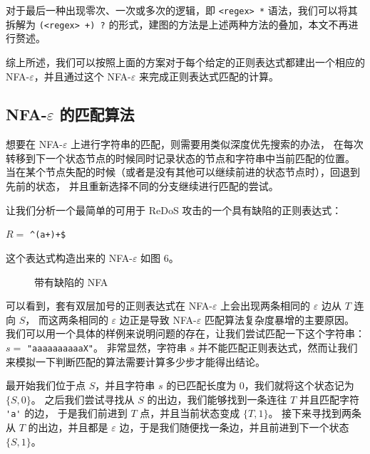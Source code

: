 \documentclass[hyperref,UTF8,12pt,a4paper]{ctexart}
\begin{document}
对于最后一种出现零次、一次或多次的逻辑，即 \verb|<regex> *| 语法，我们可以将其拆解为 \verb|(<regex> +) ?| 的形式，建图的方法是上述两种方法的叠加，本文不再进行赘述。

综上所述，我们可以按照上面的方案对于每个给定的正则表达式都建出一个相应的 NFA-$\varepsilon$，并且通过这个 NFA-$\varepsilon$ 来完成正则表达式匹配的计算。

\subsection{NFA-$\varepsilon$ 的匹配算法}

想要在 NFA-$\varepsilon$ 上进行字符串的匹配，则需要用类似深度优先搜索的办法，
在每次转移到下一个状态节点的时候同时记录状态的节点和字符串中当前匹配的位置。
当在某个节点失配的时候（或者是没有其他可以继续前进的状态节点时），回退到先前的状态，
并且重新选择不同的分支继续进行匹配的尝试。

让我们分析一个最简单的可用于 ReDoS 攻击的一个具有缺陷的正则表达式：

$R=$ \verb|^(a+)+$|

这个表达式构造出来的 NFA-$\varepsilon$ 如图 6。

\begin{figure}[h]
	\centering
	\caption{带有缺陷的 NFA}
\end{figure}

可以看到，套有双层加号的正则表达式在 NFA-$\varepsilon$ 上会出现两条相同的 $\varepsilon$ 边从 $T$ 连向 $S$，
而这两条相同的 $\varepsilon$ 边正是导致 NFA-$\varepsilon$ 匹配算法复杂度暴增的主要原因。
我们可以用一个具体的样例来说明问题的存在，让我们尝试匹配一下这个字符串：$s=$ \verb|"aaaaaaaaaaX"|。
非常显然，字符串 $s$ 并不能匹配正则表达式，然而让我们来模拟一下判断匹配的算法需要计算多少步才能得出结论。

最开始我们位于点 $S$，并且字符串 $s$ 的已匹配长度为 $0$，我们就将这个状态记为 $\{S, 0\}$。
之后我们尝试寻找从 $S$ 的出边，我们能够找到一条连往 $T$ 并且匹配字符 \verb|'a'| 的边，
于是我们前进到 $T$ 点，并且当前状态变成 $\{T, 1\}$。
接下来寻找到两条从 $T$ 的出边，并且都是 $\varepsilon$ 边，于是我们随便找一条边，并且前进到下一个状态 $\{S, 1\}$。
\end{document}
